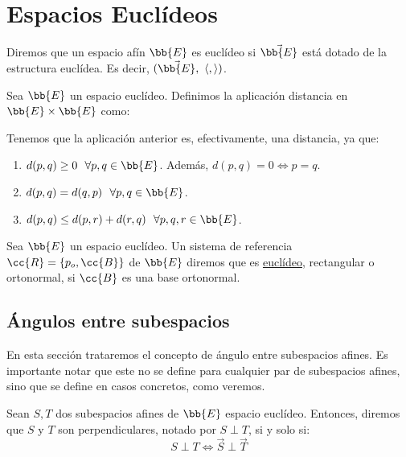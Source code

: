 \chapter{Espacios Euclídeos}

\begin{definicion}
    Diremos que un espacio afín $\bb{E}$ es euclídeo si $\vec{\bb{E}}$ está dotado de la estructura euclídea. Es decir, $(\vec{\bb{E}},~\langle,\rangle)$.
\end{definicion}


\begin{definicion}[Distancia]
    Sea $\bb{E}$ un espacio euclídeo. Definimos la aplicación distancia en $\bb{E}\times \bb{E}$ como:
\end{definicion}

Tenemos que la aplicación anterior es, efectivamente, una distancia, ya que:
\begin{enumerate}
    \item $d(p,q)\geq 0~~\forall p,q\in \bb{E}$. Además, $d(p,q)=0\Longleftrightarrow p=q$.
    \item $d(p,q)=d(q,p)~~\forall p,q\in \bb{E}$.
    \item $d(p,q)\leq d(p,r) + d(r,q)~~\forall p,q,r\in \bb{E}$.
\end{enumerate}

\begin{definicion}
    Sea $\bb{E}$ un espacio euclídeo. Un sistema de referencia $\cc{R}=\{p_o,\cc{B}\}$ de $\bb{E}$ diremos que es \ul{euclídeo}, rectangular o ortonormal, si $\cc{B}$ es una base ortonormal.
\end{definicion}

\section{Ángulos entre subespacios}
En esta sección trataremos el concepto de ángulo entre subespacios afines. Es importante notar que
este no se define para cualquier par de subespacios afines, sino que se define en casos concretos, como veremos.
\begin{definicion}
    Sean $S,T$ dos subespacios afines de $\bb{E}$ espacio euclídeo. Entonces, diremos que $S$ y $T$ son perpendiculares, notado por $S\perp T$, si y solo si:
    \begin{equation*}
        S\perp T \Longleftrightarrow \vec{S}\perp \vec{T}
    \end{equation*}
\end{definicion}

